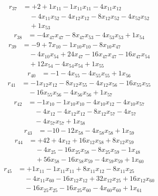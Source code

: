 \[\begin{aligned}
r_{37} &= + 2 + 1 x_{11} - 1 x_{11} x_{11} - 4 x_{11} x_{12} \\
 &\quad - 4 x_{11} x_{52} - 4 x_{12} x_{12} - 8 x_{12} x_{52} - 4 x_{52} x_{52} \\
 &\quad + 1 x_{53}
\end{aligned}\]
\[\begin{aligned}
r_{38} &= - 4 x_{47} x_{47} - 8 x_{47} x_{53} - 4 x_{53} x_{53} + 1 x_{54}
\end{aligned}\]
\[\begin{aligned}
r_{39} &= - 9 + 7 x_{10} - 1 x_{10} x_{10} - 8 x_{10} x_{47} \\
 &\quad - 4 x_{10} x_{54} + 24 x_{47} - 16 x_{47} x_{47} - 16 x_{47} x_{54} \\
 &\quad + 12 x_{54} - 4 x_{54} x_{54} + 1 x_{55}
\end{aligned}\]
\[\begin{aligned}
r_{40} &= - 1 - 4 x_{55} - 4 x_{55} x_{55} + 1 x_{56}
\end{aligned}\]
\[\begin{aligned}
r_{41} &= - 1 x_{12} x_{12} - 8 x_{12} x_{55} - 4 x_{12} x_{56} - 16 x_{55} x_{55} \\
 &\quad - 16 x_{55} x_{56} - 4 x_{56} x_{56} + 1 x_{57}
\end{aligned}\]
\[\begin{aligned}
r_{42} &= - 1 x_{10} - 1 x_{10} x_{10} - 4 x_{10} x_{12} - 4 x_{10} x_{57} \\
 &\quad - 4 x_{12} - 4 x_{12} x_{12} - 8 x_{12} x_{57} - 4 x_{57} \\
 &\quad - 4 x_{57} x_{57} + 1 x_{58}
\end{aligned}\]
\[\begin{aligned}
r_{43} &= - 10 - 12 x_{58} - 4 x_{58} x_{58} + 1 x_{59}
\end{aligned}\]
\[\begin{aligned}
r_{44} &= + 42 + 4 x_{12} + 16 x_{12} x_{58} + 8 x_{12} x_{59} \\
 &\quad - 4 x_{25} - 16 x_{25} x_{58} - 8 x_{25} x_{59} - 1 x_{48} \\
 &\quad + 56 x_{58} - 16 x_{58} x_{59} - 4 x_{59} x_{59} + 1 x_{60}
\end{aligned}\]
\[\begin{aligned}
r_{45} &= + 1 x_{11} - 1 x_{11} x_{11} + 8 x_{11} x_{12} - 8 x_{11} x_{25} \\
 &\quad - 4 x_{11} x_{60} - 16 x_{12} x_{12} + 32 x_{12} x_{25} + 16 x_{12} x_{60} \\
 &\quad - 16 x_{25} x_{25} - 16 x_{25} x_{60} - 4 x_{60} x_{60} + 1 x_{61}
\end{aligned}\]
